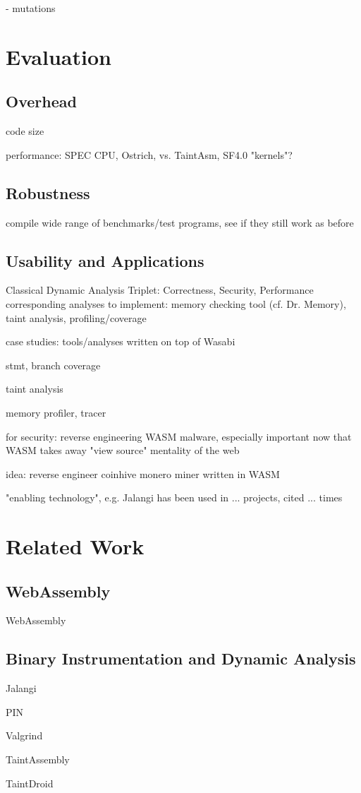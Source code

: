 \documentclass[sigplan,review,anonymous]{acmart}\settopmatter{printfolios=true,printccs=false,printacmref=false}
\newcommand{\name}{Wasabi}
\begin{document}
- mutations

\newpage
\section{Evaluation}

\subsection{Overhead}
code size

performance: SPEC CPU, Ostrich, vs. TaintAsm, SF4.0 "kernels"?

\subsection{Robustness}
compile wide range of benchmarks/test programs, see if they still work as before

\subsection{Usability and Applications}
Classical Dynamic Analysis Triplet: Correctness, Security, Performance
corresponding analyses to implement: memory checking tool (cf. Dr. Memory), taint analysis, profiling/coverage

case studies: tools/analyses written on top of \name

stmt, branch coverage

taint analysis

memory profiler, tracer

for security: reverse engineering WASM malware, especially important now that WASM takes away "view source" mentality of the web

idea: reverse engineer coinhive monero miner written in WASM

"enabling technology", e.g. Jalangi has been used in ... projects, cited ... times

\newpage
\section{Related Work}

\subsection{WebAssembly}

WebAssembly \cite{Haas:2017:BWU:3062341.3062363}

\subsection{Binary Instrumentation and Dynamic Analysis}

Jalangi \cite{Sen:2013:JSR:2491411.2491447}

PIN \cite{Luk:2005:PBC:1065010.1065034}

Valgrind \cite{Nethercote:2007:VFH:1250734.1250746}

TaintAssembly \cite{2018arXiv180201050F}

TaintDroid \cite{Enck:2014:TIT:2642648.2619091}


\end{document}
